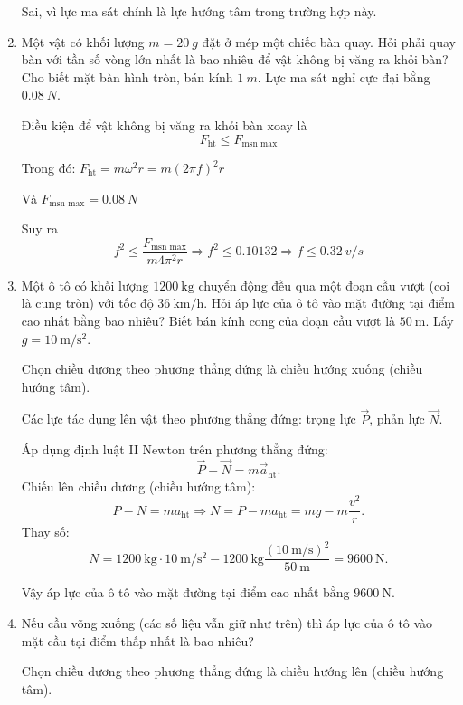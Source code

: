 \begin{enumerate}[label=\bfseries Câu \arabic*:]
{\begin{enumerate}
			Sai, vì lực ma sát chính là lực hướng tâm trong trường hợp này.
		\end{enumerate}
	}
	\item {}
	
	\cauhoi
	{Một vật có khối lượng $m=\SI{20}{g}$ đặt ở mép một chiếc bàn quay. Hỏi phải quay bàn với tần số vòng lớn nhất là bao nhiêu để vật không bị văng ra khỏi bàn? Cho biết mặt bàn hình tròn, bán kính $\SI{1}{m}$. Lực ma sát nghỉ cực đại bằng $\SI{0.08}{N}$.
	}
	
	\loigiai
	{Điều kiện để vật không bị văng ra khỏi bàn xoay là
		$$F_\text{ht} \leq F_\text{msn max}$$
		
	Trong đó: $F_\text{ht} = m\omega^2 r = m (2\pi f)^2 r$
	
	Và $F_\text{msn max} = \SI{0.08}{N}$
	
	Suy ra $$f^2 \leq \dfrac{F_\text{msn max}}{m 4 \pi ^2 r} \Rightarrow f^2 \leq {0.10132} \Rightarrow f\leq \SI{0.32}{v/s}$$
	}
	\item {}
	
	\cauhoi
	{Một ô tô có khối lượng $\SI{1200}{\kilogram}$ chuyển động đều qua một đoạn cầu vượt (coi là cung tròn) với tốc độ $\SI{36}{\kilo \meter / \hour}$. Hỏi áp lực của ô tô vào mặt đường tại điểm cao nhất bằng bao nhiêu? Biết bán kính cong của đoạn cầu vượt là $\SI{50}{\meter}$. Lấy $g=\SI{10}{\meter / \second ^2}$.
	}
	
	\loigiai
	{
	Chọn chiều dương theo phương thẳng đứng là chiều hướng xuống (chiều hướng tâm).
	
	Các lực tác dụng lên vật theo phương thẳng đứng: trọng lực $\vec P$, phản lực $\vec N$.
	
	Áp dụng định luật II Newton trên phương thẳng đứng:
	$$\vec P + \vec N = m \vec a_\text{ht}.$$
	Chiếu lên chiều dương (chiều hướng tâm):
	$$P-N=ma_\text {ht} \Rightarrow N=P-ma_\text{ht} = mg - m \dfrac{v^2}{r}.$$
	Thay số:
	$$N=\SI{1200}{\kilogram} \cdot \SI{10}{\meter / \second ^2} - \SI{1200}{\kilogram} \dfrac{(\SI{10}{\meter / \second})^2}{\SI{50}{\meter}} = \SI{9600}{\newton}.$$
	
	Vậy áp lực của ô tô vào mặt đường tại điểm cao nhất bằng $\SI{9600}{\newton}$.
	}
	\item {}
	
	\cauhoi
	{Nếu cầu võng xuống (các số liệu vẫn giữ như trên) thì áp lực của ô tô vào mặt cầu tại điểm thấp nhất là bao nhiêu?
	}
	
	\loigiai
	{Chọn chiều dương theo phương thẳng đứng là chiều hướng lên (chiều hướng tâm).
		
}
\end{enumerate}
